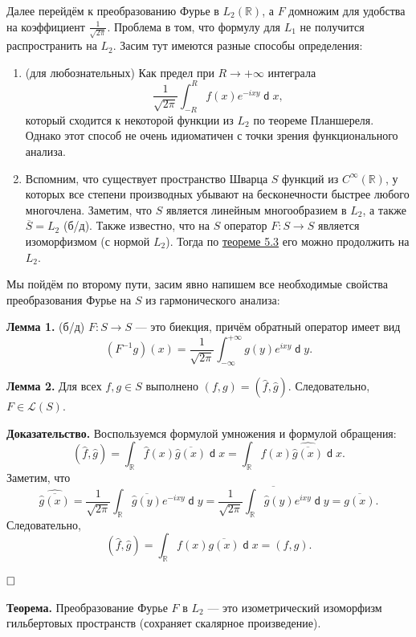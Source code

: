 \documentclass[12pt, a4paper]{article}
\DeclareMathOperator{\dif}{\mathsf{d}}
\newcommand{\QED}{$\hfill\square$}
\begin{document}
Далее перейдём к преобразованию Фурье в $L_2(\mathbb R)$, а $F$ домножим для удобства на коэффициент $\frac{1}{\sqrt{2\pi}}$. Проблема в том, что формулу для $L_1$ не получится распространить на $L_2$.
Засим тут имеются разные способы определения:
\begin{enumerate}
    \item (для любознательных) Как предел при $R \to +\infty$ интеграла
        \[
            \frac{1}{\sqrt{2\pi}} \int_{-R}^R f(x) e^{-ixy} \dif x,
        \]
        который сходится к некоторой функции из $L_2$ по теореме Планшереля. Однако этот способ не очень идиоматичен с точки зрения функционального анализа.

    \item Вспомним, что существует пространство Шварца $S$ функций из $C^\infty(\mathbb R)$, у которых все степени производных убывают на бесконечности быстрее любого многочлена. Заметим, что $S$ является линейным многообразием в $L_2$, а также $\overline S = L_2$ (б/д). Также известно, что на $S$ оператор $F: S \to S$ является изоморфизмом (с нормой $L_2$). Тогда по \hyperref[th:5-3]{теореме 5.3} его можно продолжить на $L_2$.
\end{enumerate}

Мы пойдём по второму пути, засим явно напишем все необходимые свойства преобразования Фурье на $S$ из гармонического анализа:

\textbf{Лемма 1.} (б/д) $F: S \to S$ --- это биекция, причём обратный оператор имеет вид
\[
    (F^{-1} g)(x) = \frac{1}{\sqrt{2\pi}} \int_{-\infty}^{+\infty} g(y) e^{ixy} \dif y.
\]

\textbf{Лемма 2.} Для всех $f, g \in S$ выполнено $(f, g) = (\hat f, \hat g)$. Следовательно, $F \in \mathcal{L}(S)$.

\textbf{Доказательство.} Воспользуемся формулой умножения и формулой обращения:
\[
    (\hat f, \hat g) = \int_{\mathbb R} \hat f(x) \overline{\hat g(x)} \dif x = \int_{\mathbb R} f(x) \widehat{\overline{\hat g(x)}} \dif x.
\]
Заметим, что
\[
    \widehat{\overline{\hat g(x)}} = \frac{1}{\sqrt{2\pi}} \int_{\mathbb R} \overline{\hat g(y)} e^{-ixy} \dif y = \overline{\frac{1}{\sqrt{2\pi}} \int_{\mathbb R} \hat g(y) e^{ixy} \dif y} = \overline{g(x)}.
\]
Следовательно,
\[
    (\hat f, \hat g) = \int_{\mathbb R} f(x) \overline{g(x)} \dif x = (f, g).
\]

\QED

\textbf{Теорема.} Преобразование Фурье $F$ в $L_2$ --- это изометрический изоморфизм гильбертовых пространств (сохраняет скалярное произведение).
\end{document}
